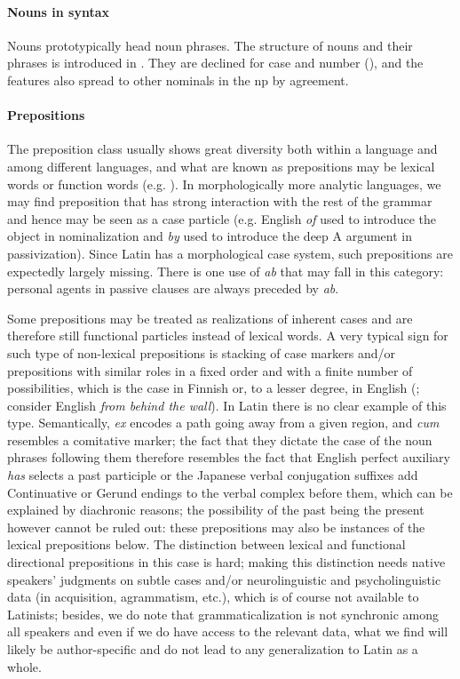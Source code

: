\documentclass[a4paper, oneside, 12pt]{report}
\newcommand{\form}[1]{\emph{#1}}
\begin{document}
\paragraph*{Nouns in syntax}
Nouns prototypically head noun phrases.
The structure of nouns and their phrases is introduced in .
They are declined for case and number (),
and the features also spread to other nominals in the \acs{np} by agreement.

\paragraph*{Prepositions} The preposition class usually shows great diversity  
both within a language and among different languages,
and what are known as prepositions may be lexical words or function words 
(e.g. \citealt{garzonio2021functional}).
In morphologically more analytic languages, 
we may find preposition that has strong interaction with the rest of the grammar 
and hence may be seen as a case particle 
(e.g. English \form{of} used to introduce the object in nominalization 
and \form{by} used to introduce the deep A argument in passivization).
Since Latin has a morphological case system, 
such prepositions are expectedly largely missing.
There is one use of \form{ab} that may fall in this category:
personal agents in passive clauses are always 
preceded by \form{ab}.

Some prepositions may be treated as realizations of inherent cases
and are therefore still functional particles instead of lexical words.
A very typical sign for such type of non-lexical prepositions is 
stacking of case markers and/or prepositions with similar roles in a fixed order 
and with a finite number of possibilities, 
which is the case in Finnish or, to a lesser degree, in English 
(\citealt{spatialpp}; consider English \form{from behind the wall}).
In Latin there is no clear example of this type.
Semantically, \form{ex} encodes a path going away from a given region, 
and \form{cum} resembles a comitative marker; 
the fact that they dictate the case of the noun phrases following them 
therefore resembles the fact that English perfect auxiliary \form{has} selects a past participle 
or the Japanese verbal conjugation suffixes add Continuative or Gerund endings to the verbal complex before them,
which can be explained by diachronic reasons; 
the possibility of the past being the present however cannot be ruled out:
these prepositions may also be instances of the lexical prepositions below. 
The distinction between lexical and functional directional prepositions in this case is hard;
making this distinction needs native speakers' judgments on subtle cases 
and/or neurolinguistic and psycholinguistic data 
(in acquisition, agrammatism, etc.),
which is of course not available to Latinists;
besides, we do note that grammaticalization is not synchronic among all speakers 
and even if we do have access to the relevant data,
what we find will likely be author-specific and do not lead to any generalization to Latin as a whole.
\end{document}
